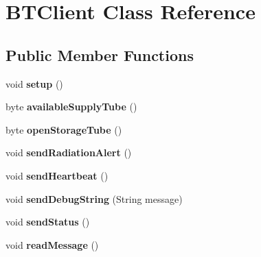 \hypertarget{classBTClient}{\section{B\-T\-Client Class Reference}
\label{classBTClient}
}
\subsection*{Public Member Functions}
\begin{DoxyCompactItemize}
\item 
\hypertarget{classBTClient_aefdc156fe1f22455d249ec0bb7fa3fd5}{void {\bfseries setup} ()}\label{classBTClient_aefdc156fe1f22455d249ec0bb7fa3fd5}

\item 
\hypertarget{classBTClient_a2a2e8a132c281d57f821f4dc564b8302}{byte {\bfseries available\-Supply\-Tube} ()}\label{classBTClient_a2a2e8a132c281d57f821f4dc564b8302}

\item 
\hypertarget{classBTClient_a915995939be1e6ee8c32ab34121fc728}{byte {\bfseries open\-Storage\-Tube} ()}\label{classBTClient_a915995939be1e6ee8c32ab34121fc728}

\item 
\hypertarget{classBTClient_a70cc30b8de8632bd6fb81972a9409a10}{void {\bfseries send\-Radiation\-Alert} ()}\label{classBTClient_a70cc30b8de8632bd6fb81972a9409a10}

\item 
\hypertarget{classBTClient_a4bf8f58f2c83834cab585e69c55c171f}{void {\bfseries send\-Heartbeat} ()}\label{classBTClient_a4bf8f58f2c83834cab585e69c55c171f}

\item 
\hypertarget{classBTClient_a57a82b64a1233a66450c1d9ebe48774c}{void {\bfseries send\-Debug\-String} (String message)}\label{classBTClient_a57a82b64a1233a66450c1d9ebe48774c}

\item 
\hypertarget{classBTClient_a8820e63eebe5ab16fac9b7cb522fc55a}{void {\bfseries send\-Status} ()}\label{classBTClient_a8820e63eebe5ab16fac9b7cb522fc55a}

\item 
\hypertarget{classBTClient_a8e827d16926d45a4b7c18dda0e59837b}{void {\bfseries read\-Message} ()}\label{classBTClient_a8e827d16926d45a4b7c18dda0e59837b}

\end{DoxyCompactItemize}
